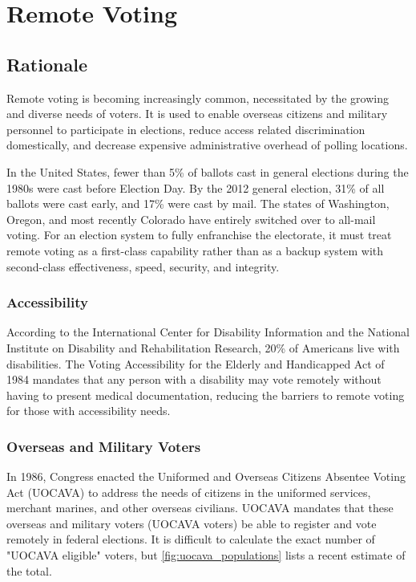 \chapter{Remote Voting}
\label{chapter:remote_voting}

\section{Rationale}
Remote voting is becoming increasingly common, necessitated by the growing
and diverse needs of voters. It is used to enable overseas
citizens and military personnel to participate in elections, reduce
access related discrimination domestically, and decrease expensive
administrative overhead of polling locations. 

In the United States, fewer than 5\% of ballots cast in general
elections during the 1980s were cast before Election Day. By the 2012
general election, 31\% of all ballots were cast early, and 17\% were
cast by mail. The states of Washington, Oregon, and most recently
Colorado have entirely switched over to all-mail voting. For an
election system to fully enfranchise the electorate, it must treat
remote voting as a first-class capability rather than as a backup
system with second-class effectiveness, speed, security, and
integrity.

\subsection{Accessibility}
According to the International Center for Disability Information and
the National Institute on Disability and Rehabilitation Research, 20\%
of Americans live with disabilities. The Voting Accessibility for the
Elderly and Handicapped Act of 1984 mandates that any person with a
disability may vote remotely without having to present medical
documentation, reducing the barriers to remote voting for those with
accessibility needs.


\subsection{Overseas and Military Voters}
In 1986, Congress enacted the Uniformed and Overseas Citizens Absentee
Voting Act (UOCAVA) to address the needs of citizens in the uniformed
services, merchant marines, and other overseas civilians. UOCAVA
mandates that these overseas and military voters (UOCAVA voters) be
able to register and vote remotely in federal elections. It is
difficult to calculate the exact number of "UOCAVA eligible" voters,
but \autoref{fig:uocava_populations} lists a recent estimate of the
total.

